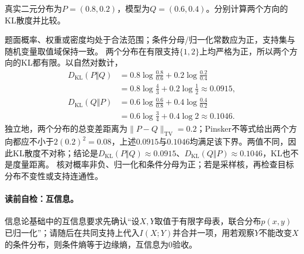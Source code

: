 \label{struct:V1-C06-CH20}
\begin{example}[二元分布的双向KL比较]\label{exm:V1-C06-kl-asymmetry}
真实二元分布为$P=(0.8,0.2)$，模型为$Q=(0.6,0.4)$。分别计算两个方向的KL散度并比较。
\end{example}
\begin{solution}
\SolGiven 题面概率、权重或密度均处于合法范围；条件分母/归一化常数应为正，支持集与随机变量取值域保持一致。
\SolDerive
两个分布在有限支持$\{1,2\}$上均严格为正，所以两个方向的KL都有限。以自然对数计，
\[
\begin{aligned}
D_{\mathrm{KL}}(P\Vert Q)
&=0.8\log\frac{0.8}{0.6}+0.2\log\frac{0.2}{0.4}\\
&=0.8\log\frac43+0.2\log\frac12
\approx0.0915,\\
D_{\mathrm{KL}}(Q\Vert P)
&=0.6\log\frac{0.6}{0.8}+0.4\log\frac{0.4}{0.2}\\
&=0.6\log\frac34+0.4\log2
\approx0.1046.
\end{aligned}
\]
独立地，两个分布的总变差距离为$\lVert P-Q\rVert_{\mathrm{TV}}=0.2$；Pinsker不等式给出两个方向都应不小于$2(0.2)^2=0.08$，上述$0.0915$与$0.1046$均满足该下界。两值不同，因此KL散度不对称；结论是$D_{\mathrm{KL}}(P\Vert Q)\approx0.0915$、$D_{\mathrm{KL}}(Q\Vert P)\approx0.1046$，KL也不是度量距离。
\SolCheck 核对概率非负、归一化和条件分母为正；若是采样核，再检查目标分布不变性或支持连通性。
\end{solution}


\paragraph{读前自检：互信息。}信息论基础中的互信息要求先确认“设$X,Y$取值于有限字母表，联合分布$p(x,y)$已归一化”；请随后在共同支持上代入$I(X;Y)$并合并一项，用若观察$Y$不能改变$X$的条件分布，则条件熵等于边缘熵，互信息为0验收。\par

